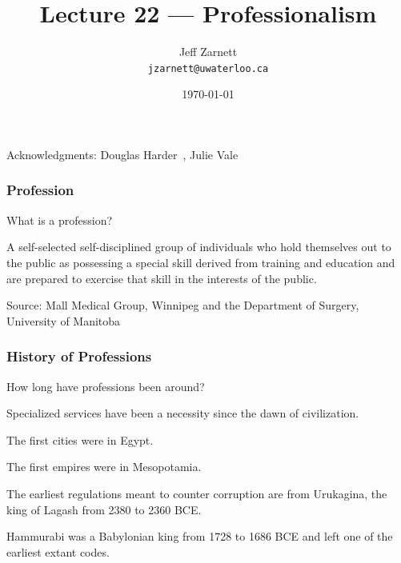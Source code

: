 

\title{Lecture 22 --- Professionalism }

\author{Jeff Zarnett \\ \small \texttt{jzarnett@uwaterloo.ca}}
\date{\today}




\begin{frame}
  \titlepage

\begin{center}
  \small{Acknowledgments: Douglas Harder~\cite{dwh}, Julie Vale~\cite{jv}}
  \end{center}
\end{frame}




\begin{frame}
\frametitle{Profession}

What is a profession?

	A self-selected self-disciplined group of individuals who hold themselves out to the public as possessing a special skill derived from training and education and are prepared to exercise that skill in the interests of the public.

{\scriptsize Source: Mall Medical Group, Winnipeg and the Department of Surgery, University of Manitoba}

\end{frame}




\begin{frame}
\frametitle{History of Professions}

How long have professions been around?

Specialized services have been a necessity since the dawn of civilization.

The first cities were in Egypt.

The first empires were in Mesopotamia.

The earliest regulations meant to counter corruption are from Urukagina, the king of Lagash from 2380 to 2360 BCE.

Hammurabi was a Babylonian king from 1728 to 1686 BCE and left one of the earliest extant codes.

\end{frame}



